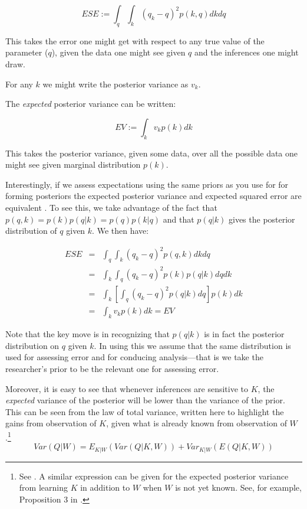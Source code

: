 \documentclass[
  12pt,
]{book}
\begin{document}
\[ESE := \int_q\int_k \left({q}_k-q\right)^2p(k, q)dkdq \]

This takes the error one might get with respect to any true value of the parameter (\(q\)), given the data one might see given \(q\) and the inferences one might draw.

For any \(k\) we might write the posterior variance as \(v_k\).

The \emph{expected} posterior variance can be written:

\[EV := \int_k v_k p(k)dk\]

This takes the posterior variance, given some data, over all the possible data one might see given marginal distribution \(p(k)\).

Interestingly, if we assess expectations using the same priors as you use for for forming posteriors the expected posterior variance and expected squared error are equivalent \citep{scharf1991statistical}.
To see this, we take advantage of the fact that \(p(q,k) = p(k)p(q|k) = p(q)p(k|q)\) and that \(p(q|k)\) gives the posterior distribution of \(q\) given \(k\). We then have:

\begin{eqnarray}
ESE &=& \int_q\int_k \left({q}_k-q\right)^2p(q,k)dkdq \\
    &=& \int_k\int_q \left({q}_k-q\right)^2p(k)p(q|k)dq dk \\
    &=& \int_k\left[\int_q \left({q}_k-q\right)^2p(q|k)dq\right]p(k)dk \\
    &=& \int_k v_k p(k)dk  = EV
\end{eqnarray}

Note that the key move is in recognizing that \(p(q |k)\) is in fact the posterior distribution on \(q\) given \(k\). In using this we assume that the same distribution is used for assessing error and for conducing analysis---that is we take the researcher's prior to be the relevant one for assessing error.

Moreover, it is easy to see that whenever inferences are sensitive to \(K\), the \emph{expected} variance of the posterior will be lower than the variance of the prior. This can be seen from the law of total variance, written here to highlight the gains from observation of \(K\), given what is already known from observation of \(W\).\footnote{See \citet{raiffa1961applied}. A similar expression can be given for the expected posterior variance from learning \(K\) in addition to \(W\) when \(W\) is not yet known. See, for example, Proposition 3 in \citet{geweke2014analysis}.}\\
\[Var(Q|W) = E_{K|W}(Var(Q|K,W)) +Var_{K|W}(E(Q|K,W))\]
\end{document}
